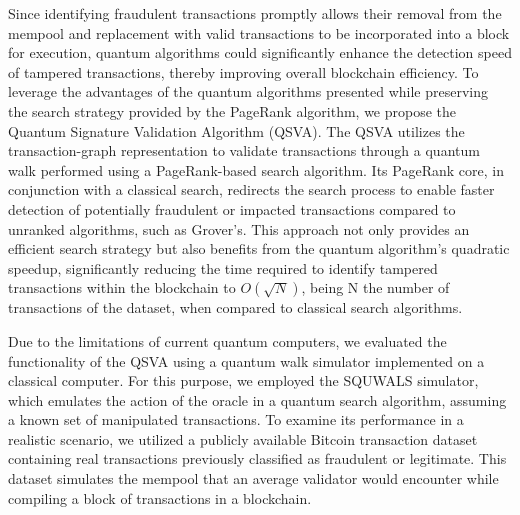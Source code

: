 \documentclass[nofootinbib,aps,prd,reprint,superscriptaddress,floatfix]{revtex4-2}
\begin{document}
Since identifying fraudulent transactions promptly allows their removal from the mempool and replacement with valid transactions to be incorporated into a block for execution, quantum algorithms could significantly enhance the detection speed of tampered transactions, thereby improving overall blockchain efficiency. To leverage the advantages of the quantum algorithms presented while preserving the search strategy provided by the PageRank algorithm, we propose the Quantum Signature Validation Algorithm (QSVA). The QSVA utilizes the transaction-graph representation to validate transactions through a quantum walk performed using a PageRank-based search algorithm. Its PageRank core, in conjunction with a classical search, redirects the search process to enable faster detection of potentially fraudulent or impacted transactions compared to unranked algorithms, such as Grover’s. This approach not only provides an efficient search strategy but also benefits from the quantum algorithm's quadratic speedup, significantly reducing the time required to identify tampered transactions within the blockchain to $O(\sqrt{N})$, being N the number of transactions of the dataset, when compared to classical search algorithms. 

Due to the limitations of current quantum computers, we evaluated the functionality of the QSVA using a quantum walk simulator implemented on a classical computer. For this purpose, we employed the SQUWALS simulator, which emulates the action of the oracle in a quantum search algorithm, assuming a known set of manipulated transactions. To examine its performance in a realistic scenario, we utilized a publicly available Bitcoin transaction dataset containing real transactions previously classified as fraudulent or legitimate. This dataset simulates the mempool that an average validator would encounter while compiling a block of transactions in a blockchain. 
\end{document}
